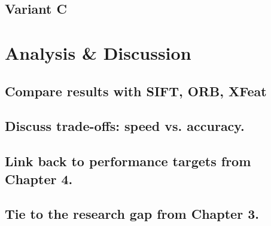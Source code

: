 \subsection{Variant C}
\section{Analysis \& Discussion}
\subsection{Compare results with SIFT, ORB, XFeat}
\subsection{Discuss trade-offs: speed vs. accuracy.}
\subsection{Link back to performance targets from Chapter 4.}
\subsection{Tie to the research gap from Chapter 3.}

